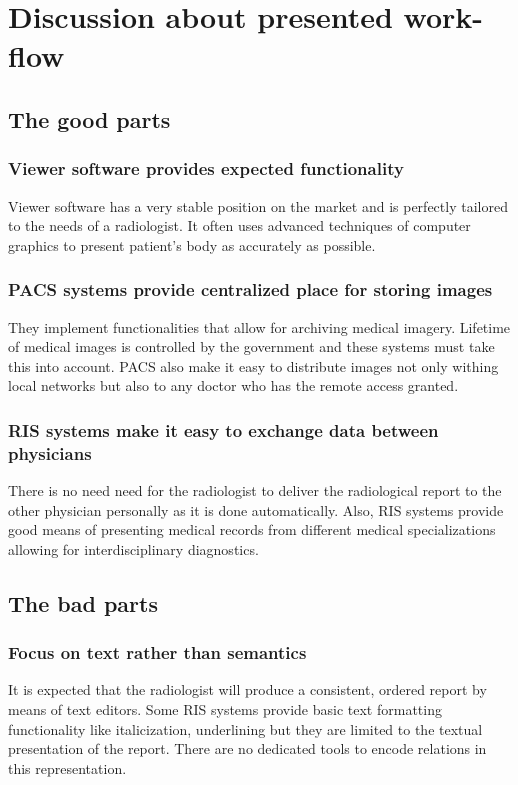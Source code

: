 \documentclass[12pt, twoside, openany]{report}
\theoremstyle{definition}
\begin{document}
\section{Discussion about presented work-flow}
\subsection{The good parts}
\subsubsection{Viewer software provides expected functionality}
Viewer software has a very stable position on the market and is perfectly tailored to the needs of a radiologist. It often uses advanced techniques of computer graphics to present patient's body as accurately as possible.
\subsubsection{PACS systems provide centralized place for storing images}
They implement functionalities that allow for archiving medical imagery. Lifetime of medical images is controlled by the government and these systems must take this into account. PACS also make it easy to distribute images not only withing local networks but also to any doctor who has the remote access granted.  
\subsubsection{RIS systems make it easy to exchange data between physicians}
There is no need need for the radiologist to deliver the radiological report to the other physician personally as it is done automatically. Also, RIS systems provide good means of presenting medical records from different medical specializations allowing for interdisciplinary diagnostics. 
\subsection{The bad parts}
\subsubsection{Focus on text rather than semantics}
It is expected that the radiologist will produce a consistent, ordered report by means of text editors. Some RIS systems provide basic text formatting functionality like italicization, underlining but they are limited to the textual presentation of the report. There are no dedicated tools to encode relations in this representation.
\end{document}
